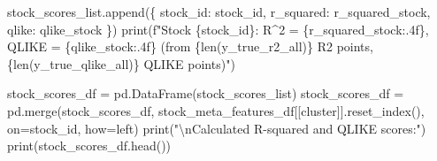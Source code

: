 \documentclass[
  letterpaper,
  DIV=11,
  numbers=noendperiod]{scrartcl}
\newenvironment{Shaded}{\begin{snugshade}}{\end{snugshade}}
\newcommand{\BuiltInTok}[1]{\textcolor[rgb]{0.00,0.23,0.31}{#1}}
\newcommand{\CharTok}[1]{\textcolor[rgb]{0.13,0.47,0.30}{#1}}
\newcommand{\NormalTok}[1]{\textcolor[rgb]{0.00,0.23,0.31}{#1}}
\newcommand{\OperatorTok}[1]{\textcolor[rgb]{0.37,0.37,0.37}{#1}}
\newcommand{\SpecialCharTok}[1]{\textcolor[rgb]{0.37,0.37,0.37}{#1}}
\newcommand{\SpecialStringTok}[1]{\textcolor[rgb]{0.13,0.47,0.30}{#1}}
\newcommand{\StringTok}[1]{\textcolor[rgb]{0.13,0.47,0.30}{#1}}
\begin{document}
\begin{Shaded}
\begin{Highlighting}[]
\NormalTok{    stock\_scores\_list.append(\{}
        \StringTok{\textquotesingle{}stock\_id\textquotesingle{}}\NormalTok{: stock\_id,}
        \StringTok{\textquotesingle{}r\_squared\textquotesingle{}}\NormalTok{: r\_squared\_stock,}
        \StringTok{\textquotesingle{}qlike\textquotesingle{}}\NormalTok{: qlike\_stock}
\NormalTok{    \})}
    \BuiltInTok{print}\NormalTok{(}\SpecialStringTok{f"Stock }\SpecialCharTok{\{}\NormalTok{stock\_id}\SpecialCharTok{\}}\SpecialStringTok{: R\^{}2 = }\SpecialCharTok{\{}\NormalTok{r\_squared\_stock}\SpecialCharTok{:.4f\}}\SpecialStringTok{, QLIKE = }\SpecialCharTok{\{}\NormalTok{qlike\_stock}\SpecialCharTok{:.4f\}}\SpecialStringTok{ (from }\SpecialCharTok{\{}\BuiltInTok{len}\NormalTok{(y\_true\_r2\_all)}\SpecialCharTok{\}}\SpecialStringTok{ R2 points, }\SpecialCharTok{\{}\BuiltInTok{len}\NormalTok{(y\_true\_qlike\_all)}\SpecialCharTok{\}}\SpecialStringTok{ QLIKE points)"}\NormalTok{)}
\end{Highlighting}
\end{Shaded}

\begin{Shaded}
\begin{Highlighting}[]
\NormalTok{stock\_scores\_df }\OperatorTok{=}\NormalTok{ pd.DataFrame(stock\_scores\_list)}
\NormalTok{stock\_scores\_df }\OperatorTok{=}\NormalTok{ pd.merge(stock\_scores\_df, stock\_meta\_features\_df[[}\StringTok{\textquotesingle{}cluster\textquotesingle{}}\NormalTok{]].reset\_index(), on}\OperatorTok{=}\StringTok{\textquotesingle{}stock\_id\textquotesingle{}}\NormalTok{, how}\OperatorTok{=}\StringTok{\textquotesingle{}left\textquotesingle{}}\NormalTok{)}
\BuiltInTok{print}\NormalTok{(}\StringTok{"}\CharTok{\textbackslash{}n}\StringTok{Calculated R{-}squared and QLIKE scores:"}\NormalTok{)}
\BuiltInTok{print}\NormalTok{(stock\_scores\_df.head())}
\end{Highlighting}
\end{Shaded}
\end{document}

